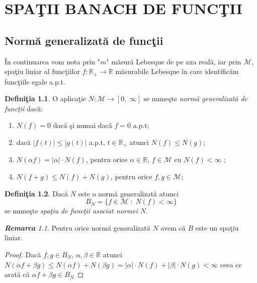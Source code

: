 \documentclass[ a4paper, 12pt]{report}
\theoremstyle{definition}
\newtheorem{definition}{\bf Defini\c tia}[section]
\theoremstyle{remark}
\newtheorem{remarc}{\bf Remarca}[section]
\numberwithin{equation}{section}
\begin{document}
\newpage
\chapter{SPA\c TII BANACH DE FUNC\c TII}
\vspace{5mm}

\section{Norm\u a generalizat\u a de func\c tii}

 \^ In continuarea vom nota prin "$m$" m\u asur\u a Lebesque de pe axa real\u a, iar prin  $\mathcal{M}$, spa\c tiu liniar al func\c tiilor $f:\mathbb{R}_+\rightarrow \mathbb{R}$ m\u asurabile Lebesque \^in care identific\u am func\c tiile egale a.p.t.

\begin{definition}\label{defnormeigen}
O aplica\c tie $N:\mathcal{M}\rightarrow[0,\; \infty]$ se nume\c ste \emph{norm\u a generalizat\u a de func\c tii} dac\u a:
\begin{enumerate}
\item $N(f)=0$ dac\u a \c si numai dac\u a $f=0$ a.p.t;
\item dac\u a $ \lvert f(t) \rvert\leqslant \lvert g(t) \rvert$ a.p.t, $t\in \mathbb{R}_+$ atunci $N(f)\leqslant N(g)$;
\item $N(\alpha f)=\lvert \alpha \rvert \cdot N(f)$, pentru orice $\alpha\in \mathbb{R}$, $f\in \mathcal{M}$ cu $N(f)<\infty$ ;
\item $N(f+g)\leqslant N(f)+N(g) $, pentru orice $f,g\in \mathcal{M}$;
\end{enumerate}
\end{definition}

\begin{definition}
Dac\u a $N$ este o norm\u a generalizat\u a atunci
$$B_N=\{f \in \mathcal{M}\; : \; N(f)<\infty\}$$ se nume\c ste \emph{spa\c tiu de func\c tii asociat normei} $N$.
\end{definition}

\begin{remarc} Pentru orice norm\u a generalizat\u a $N$ avem c\u a
$B$  este un spa\c tiu liniar.
\end{remarc}

\begin{proof}
Dac\u a $f,g\in B_N$, $\alpha,\beta \in \mathbb{R}$ atunci $N(\alpha f + \beta g)\leqslant N(\alpha f)+N(\beta g)=\lvert \alpha \rvert \cdot N(f)+\lvert \beta \rvert \cdot N(g)<\infty$ ceea ce arat\u a c\u a $\alpha f + \beta g \in B_N$
\end{proof}
\end{document}
